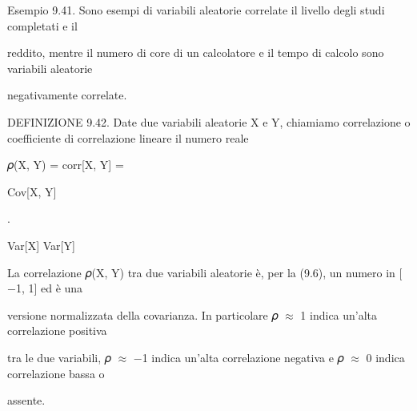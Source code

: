 \documentclass[a4paper,portrait,12pt]{article}
\begin{document}
\begin{flushleft}
Esempio 9.41. Sono esempi di variabili aleatorie correlate il livello degli studi completati e il
\end{flushleft}


\begin{flushleft}
reddito, mentre il numero di core di un calcolatore e il tempo di calcolo sono variabili aleatorie
\end{flushleft}


\begin{flushleft}
negativamente correlate.
\end{flushleft}


\begin{flushleft}
DEFINIZIONE 9.42. Date due variabili aleatorie X e Y, chiamiamo correlazione o coefficiente di correlazione lineare il numero reale
\end{flushleft}


\begin{flushleft}
𝜌(X, Y) = corr[X, Y] =
\end{flushleft}





\begin{flushleft}
Cov[X, Y]
\end{flushleft}


.


\begin{flushleft}
Var[X] Var[Y]
\end{flushleft}





\begin{flushleft}
La correlazione 𝜌(X, Y) tra due variabili aleatorie \`{e}, per la (9.6), un numero in [$-$1, 1] ed \`{e} una
\end{flushleft}


\begin{flushleft}
versione normalizzata della covarianza. In particolare 𝜌 $\approx$ 1 indica un'alta correlazione positiva
\end{flushleft}


\begin{flushleft}
tra le due variabili, 𝜌 $\approx$ $-$1 indica un'alta correlazione negativa e 𝜌 $\approx$ 0 indica correlazione bassa o
\end{flushleft}


\begin{flushleft}
assente.
\end{flushleft}
\end{document}
